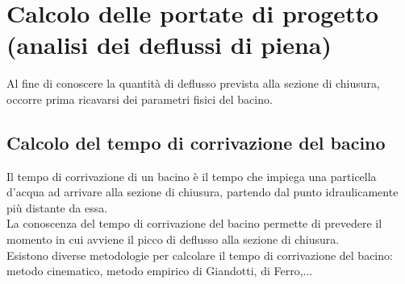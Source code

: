 \section{Calcolo delle portate di progetto (analisi dei deflussi di piena)}
Al fine di conoscere la quantità di deflusso prevista alla sezione di chiusura, occorre prima ricavarsi dei parametri fisici del bacino.

\subsection{Calcolo del tempo di corrivazione del bacino}
Il tempo di corrivazione di un bacino è il tempo che impiega una particella d'acqua ad arrivare alla sezione di chiusura, partendo dal punto idraulicamente più distante da essa.\\
La conoscenza del tempo di corrivazione del bacino permette di prevedere il momento in cui avviene il picco di deflusso alla sezione di chiusura.\\
Esistono diverse metodologie per calcolare il tempo di corrivazione del bacino: metodo cinematico, metodo empirico di Giandotti, di Ferro,...
